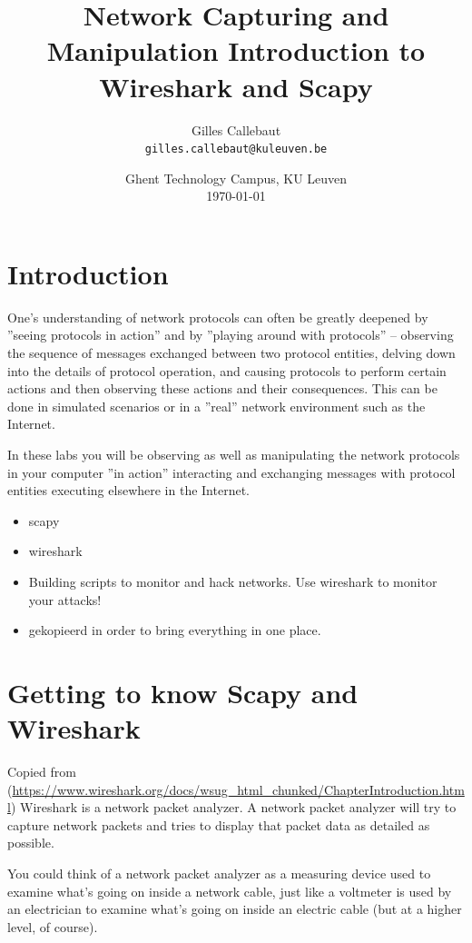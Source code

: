 \documentclass[11pt,a4paper]{article}
\title{Network Capturing and Manipulation Introduction to Wireshark and Scapy}
\author{Gilles Callebaut\\ \texttt{gilles.callebaut@kuleuven.be}}
\date{Ghent Technology Campus, KU Leuven\\ \today}
\begin{document}
 \sloppy

\maketitle

\newpage

\setcounter{tocdepth}{2}
\tableofcontents
\clearpage

\section{Introduction}
One's understanding of network protocols can often be greatly deepened by ''seeing
protocols in action'' and by ''playing around with protocols'' – observing the sequence of messages exchanged between two protocol entities, delving down into the details of protocol operation, and causing protocols to perform certain actions and then observing these actions and their consequences. This can be done in simulated scenarios or in a ''real'' network environment such as the Internet. 

In these labs you will be observing as well as manipulating the network protocols
in your computer ''in action'' interacting and exchanging messages with protocol entities executing elsewhere in the Internet. 

\begin{itemize}
    \item scapy
    \item wireshark
    \item Building scripts to monitor and hack networks. Use wireshark to monitor your attacks!
    \item gekopieerd in order to bring everything in one place.
\end{itemize}

\section{Getting to know Scapy and Wireshark}
Copied from (\url{https://www.wireshark.org/docs/wsug_html_chunked/ChapterIntroduction.html})
Wireshark is a network packet analyzer. A network packet analyzer will try to capture network packets and tries to display that packet data as detailed as possible.

You could think of a network packet analyzer as a measuring device used to examine what's going on inside a network cable, just like a voltmeter is used by an electrician to examine what's going on inside an electric cable (but at a higher level, of course).
\end{document}
